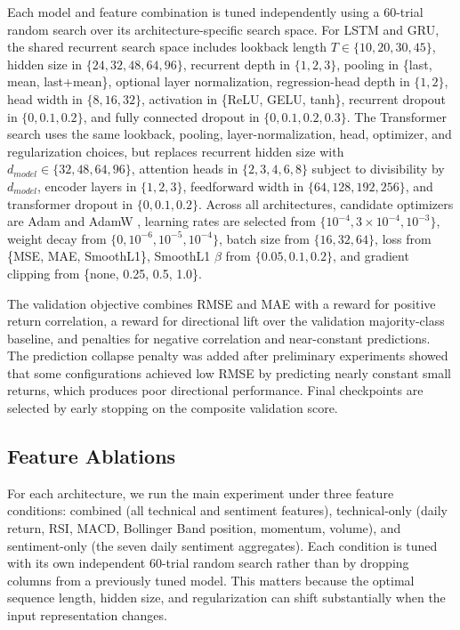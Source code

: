 \documentclass[10pt,twocolumn]{article}
\begin{document}
Each model and feature combination is tuned independently using a 60-trial random search over its architecture-specific search space. For LSTM and GRU, the shared recurrent search space includes lookback length $T \in \{10,20,30,45\}$, hidden size in $\{24,32,48,64,96\}$, recurrent depth in $\{1,2,3\}$, pooling in \{last, mean, last+mean\}, optional layer normalization, regression-head depth in $\{1,2\}$, head width in $\{8,16,32\}$, activation in \{ReLU, GELU, tanh\}, recurrent dropout in $\{0,0.1,0.2\}$, and fully connected dropout in $\{0,0.1,0.2,0.3\}$. The Transformer search uses the same lookback, pooling, layer-normalization, head, optimizer, and regularization choices, but replaces recurrent hidden size with $d_{model} \in \{32,48,64,96\}$, attention heads in $\{2,3,4,6,8\}$ subject to divisibility by $d_{model}$, encoder layers in $\{1,2,3\}$, feedforward width in $\{64,128,192,256\}$, and transformer dropout in $\{0,0.1,0.2\}$. Across all architectures, candidate optimizers are Adam \cite{kingma2015adam} and AdamW \cite{loshchilov2019adamw}, learning rates are selected from $\{10^{-4},3\times10^{-4},10^{-3}\}$, weight decay from $\{0,10^{-6},10^{-5},10^{-4}\}$, batch size from $\{16,32,64\}$, loss from \{MSE, MAE, SmoothL1\}, SmoothL1 $\beta$ from $\{0.05,0.1,0.2\}$, and gradient clipping from \{none, 0.25, 0.5, 1.0\}.

The validation objective combines RMSE and MAE with a reward for positive return correlation, a reward for directional lift over the validation majority-class baseline, and penalties for negative correlation and near-constant predictions. The prediction collapse penalty was added after preliminary experiments showed that some configurations achieved low RMSE by predicting nearly constant small returns, which produces poor directional performance. Final checkpoints are selected by early stopping on the composite validation score.

\subsection{Feature Ablations}

For each architecture, we run the main experiment under three feature conditions: combined (all technical and sentiment features), technical-only (daily return, RSI, MACD, Bollinger Band position, momentum, volume), and sentiment-only (the seven daily sentiment aggregates). Each condition is tuned with its own independent 60-trial random search rather than by dropping columns from a previously tuned model. This matters because the optimal sequence length, hidden size, and regularization can shift substantially when the input representation changes.
\end{document}
